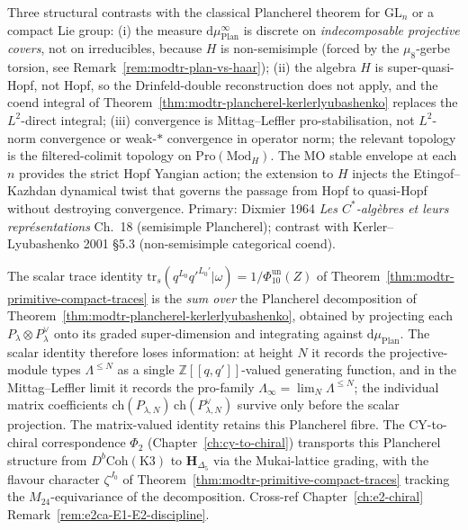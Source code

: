 \begin{remark}
\label{rem:plancherel-HS-MO-contrast}
Three structural contrasts with the classical Plancherel theorem
for $\mathrm{GL}_n$ or a compact Lie group: (i) the measure
$\mathrm d\mu_{\mathrm{Plan}}^\infty$ is discrete on
\emph{indecomposable projective covers}, not on irreducibles, because
$H$ is non-semisimple (forced by the $\mu_8$-gerbe torsion, see
Remark~\ref{rem:modtr-plan-vs-haar}); (ii) the algebra $H$
is super-quasi-Hopf, not Hopf, so the Drinfeld-double reconstruction
does not apply, and the coend integral of
Theorem~\ref{thm:modtr-plancherel-kerlerlyubashenko} replaces
the $L^2$-direct integral; (iii) convergence is Mittag--Leffler
pro-stabilisation, not $L^2$-norm convergence or weak-$*$
convergence in operator norm; the relevant topology is the
filtered-colimit topology on $\mathrm{Pro}(\mathrm{Mod}_H)$. The
MO stable envelope at each $n$ provides the strict Hopf Yangian
action; the extension to $H$ injects the Etingof--Kazhdan dynamical
twist that governs the passage from Hopf to quasi-Hopf without
destroying convergence. Primary: Dixmier 1964 \emph{Les $C^*$-alg\`ebres
et leurs repr\'esentations} Ch.~18 (semisimple Plancherel);
contrast with Kerler--Lyubashenko 2001 \S 5.3
(non-semisimple categorical coend).
\end{remark}

\begin{remark}
\label{rem:modtr-scalar-shadow}
The scalar trace identity
$\mathrm{tr}_s(q^{L_0}q'^{L_0'}|\omega) = 1/\Phi_{10}^{\mathrm{un}}(Z)$
of Theorem~\ref{thm:modtr-primitive-compact-traces} is the \emph{sum over} the Plancherel
decomposition of
Theorem~\ref{thm:modtr-plancherel-kerlerlyubashenko},
obtained by projecting each $P_\lambda\otimes P_\lambda^\vee$
onto its graded super-dimension and integrating against
$\mathrm d\mu_{\mathrm{Plan}}$. The scalar identity therefore loses
information: at height \(N\) it records the projective-module types
\(\Lambda^{\leq N}\) as a single
\(\mathbb Z[[q, q']]\)-valued generating function, and in the
Mittag--Leffler limit it records the pro-family
\(\Lambda_\infty=\lim_N\Lambda^{\leq N}\); the individual matrix
coefficients
\(\mathrm{ch}(P_{\lambda,N})\,\mathrm{ch}(P_{\lambda,N}^\vee)\)
survive only before the scalar projection. The matrix-valued identity
retains this Plancherel fibre. The CY-to-chiral
correspondence $\Phi_2$
(Chapter~\ref{ch:cy-to-chiral}) transports this Plancherel structure
from $D^b\mathrm{Coh}(\mathrm K3)$ to $\mathbf H_{\Delta_5}$ via the
Mukai-lattice grading, with the flavour character $\zeta^{J_0}$ of
Theorem~\ref{thm:modtr-primitive-compact-traces} tracking the $M_{24}$-equivariance of
the decomposition. Cross-ref
Chapter~\ref{ch:e2-chiral}
Remark~\ref{rem:e2ca-E1-E2-discipline}.
\end{remark}

